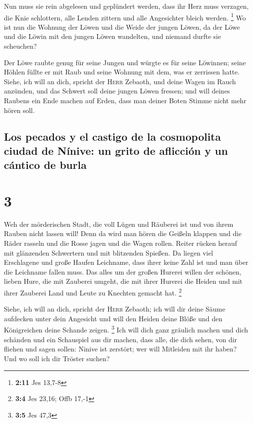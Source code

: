  Nun muss sie rein abgelesen und geplündert werden, dass
ihr Herz muss verzagen, die Knie schlottern, alle Lenden zittern und
alle Angesichter bleich werden. \footnote{\textbf{2:11} Jes 13,7-8}
 Wo ist nun die Wohnung der Löwen und die Weide der
jungen Löwen, da der Löwe und die Löwin mit den jungen Löwen wandelten,
und niemand durfte sie scheuchen?

 Der Löwe raubte genug für seine Jungen und würgte es für
seine Löwinnen; seine Höhlen füllte er mit Raub und seine Wohnung mit
dem, was er zerrissen hatte.  Siehe, ich will an dich,
spricht der \textsc{Herr} Zebaoth, und deine Wagen im Rauch anzünden,
und das Schwert soll deine jungen Löwen fressen; und will deines Raubens
ein Ende machen auf Erden, dass man deiner Boten Stimme nicht mehr hören
soll.

\hypertarget{los-pecados-y-el-castigo-de-la-cosmopolita-ciudad-de-nuxednive-un-grito-de-aflicciuxf3n-y-un-cuxe1ntico-de-burla}{%
\subsection{Los pecados y el castigo de la cosmopolita ciudad de Nínive:
un grito de aflicción y un cántico de
burla}\label{los-pecados-y-el-castigo-de-la-cosmopolita-ciudad-de-nuxednive-un-grito-de-aflicciuxf3n-y-un-cuxe1ntico-de-burla}}

\hypertarget{section-2}{%
\section{3}\label{section-2}}

 Weh der mörderischen Stadt, die voll Lügen und Räuberei
ist und von ihrem Rauben nicht lassen will!  Denn da wird
man hören die Geißeln klappen und die Räder rasseln und die Rosse jagen
und die Wagen rollen.  Reiter rücken herauf mit glänzenden
Schwertern und mit blitzenden Spießen. Da liegen viel Erschlagene und
große Haufen Leichname, dass ihrer keine Zahl ist und man über die
Leichname fallen muss.  Das alles um der großen Hurerei
willen der schönen, lieben Hure, die mit Zauberei umgeht, die mit ihrer
Hurerei die Heiden und mit ihrer Zauberei Land und Leute zu Knechten
gemacht hat. \footnote{\textbf{3:4} Jes 23,16; Offb 17,-1}

 Siehe, ich will an dich, spricht der \textsc{Herr}
Zebaoth; ich will dir deine Säume aufdecken unter dein Angesicht und
will den Heiden deine Blöße und den Königreichen deine Schande zeigen.
\footnote{\textbf{3:5} Jes 47,3}  Ich will dich ganz
gräulich machen und dich schänden und ein Schauspiel aus dir machen,
 dass alle, die dich sehen, von dir fliehen und sagen
sollen: Ninive ist zerstört; wer will Mitleiden mit ihr haben? Und wo
soll ich dir Tröster suchen?

